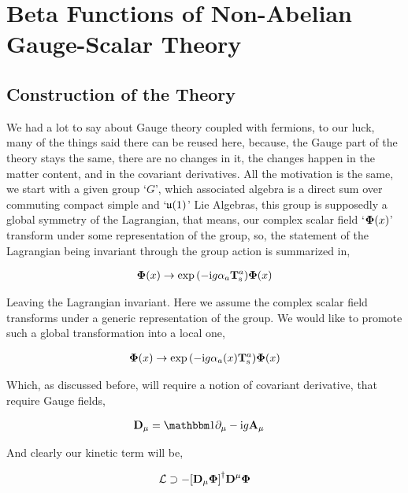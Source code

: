 \section{Beta Functions of Non-Abelian Gauge-Scalar Theory}

\subsection{Construction of the Theory}

We had a lot to say about Gauge theory coupled with fermions, to our luck, many of the things 
said there can be reused here, because, the Gauge part of the theory stays the same, there are 
no changes in it, the changes happen in the matter content, and in the covariant derivatives. 
All the motivation is the same, we start with a given group `$G$', which associated algebra is 
a direct sum over commuting compact simple and `$\mathfrak{u}\qty(1)$' Lie Algebras, this group 
is supposedly a global symmetry of the Lagrangian, that means, our complex scalar field 
`$\boldsymbol \Phi\qty(x)$' transform under some representation of the group, so, the statement 
of the Lagrangian being invariant through the group action is summarized in,

\begin{align}
    \boldsymbol\Phi\qty(x)\rightarrow \exp\qty(-\textnormal{i} g\alpha_a\vb T^a_{\textnormal{s}})\boldsymbol\Phi\qty(x)\nonumber
\end{align}

Leaving the Lagrangian invariant. Here we assume the complex scalar field transforms under a generic 
representation of the group. We would like to promote such a global transformation into a 
local one, 

\begin{align}
    \boldsymbol\Phi\qty(x)\rightarrow \exp\qty(-\textnormal{i} g\alpha_a\qty(x)\vb T^a_{\textnormal{s}})\boldsymbol\Phi\qty(x)\nonumber
\end{align}

Which, as discussed before, will require a notion of covariant derivative, that require Gauge fields,

\begin{align}
    \vb D_{\mu }&=\mathbbm 1\partial_\mu-\im g \vb A_\mu\nonumber
\end{align}

And clearly our kinetic term will be,

\begin{align}
    \mathcal L \supset -\qty[\vb D_\mu\boldsymbol\Phi]^\dagger\vb D^\mu\boldsymbol\Phi\nonumber
\end{align}


